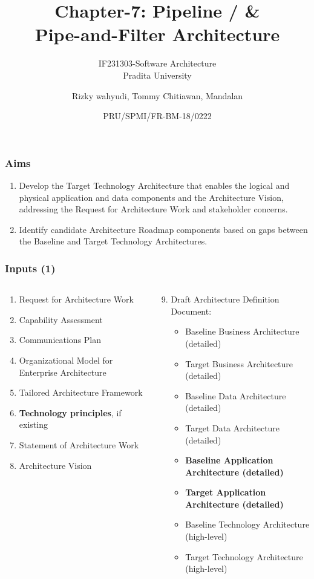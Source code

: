 \documentclass[aspectratio=169, table]{beamer}
\title{\vskip-0.7cm \Large Chapter-7: Pipeline / \&\\ Pipe-and-Filter Architecture}
\date[Serial]{\scriptsize {PRU/SPMI/FR-BM-18/0222}}
\subtitle{IF231303-Software Architecture\\Pradita University}
\author{Rizky wahyudi, Tommy Chitiawan, Mandalan}
\begin{document}
	
	\frame{\titlepage}
	
	\begin{frame}
		\frametitle{Aims}
		\begin{enumerate}
			\item Develop the Target Technology Architecture that enables the logical and physical application and data components and the Architecture Vision, addressing the Request for Architecture Work and stakeholder concerns.
			\item Identify candidate Architecture Roadmap components based on gaps between the Baseline and Target Technology Architectures.
		\end{enumerate}
	\end{frame}
	
	\begin{frame}
		\frametitle{Inputs (1)}
		\vspace{20pt}
		\begin{columns}[onlytextwidth]
			\begin{column}{0.45\textwidth}
				\begin{enumerate}
					\item Request for Architecture Work
					\item Capability Assessment
					\item Communications Plan
					\item Organizational Model for Enterprise Architecture
					\item Tailored Architecture Framework
					\item \textbf{Technology principles}, if existing
					\item Statement of Architecture Work
					\item Architecture Vision
				\end{enumerate}
			\end{column}
			\begin{column}{0.55\textwidth}
				\begin{enumerate}
					\setcounter{enumi}{8}
					\item Draft Architecture Definition Document:
					\begin{itemize}
						\item Baseline Business Architecture (detailed)
						\item Target Business Architecture (detailed)
						\item Baseline Data Architecture (detailed)
						\item Target Data Architecture (detailed)
						\item \textbf{Baseline Application Architecture (detailed)}
						\item \textbf{Target Application Architecture (detailed)}
						\item Baseline Technology Architecture (high-level)
						\item Target Technology Architecture (high-level)
					\end{itemize}
				\end{enumerate}
			\end{column}
		\end{columns}
	\end{frame}
	
\end{document}
